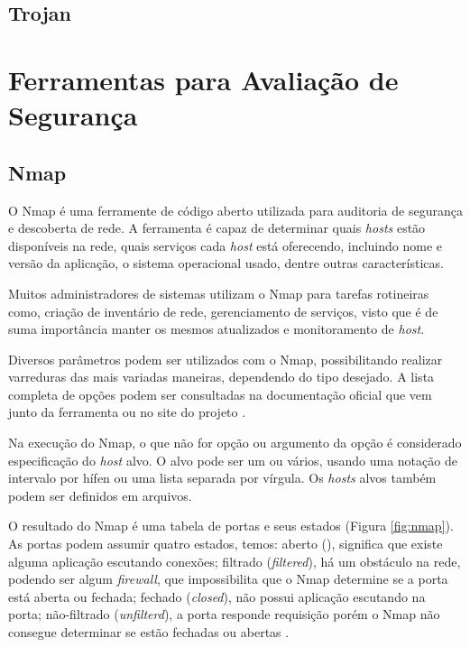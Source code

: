 \documentclass[
	12pt,				
	openright,		
	twoside,	
	a4paper,
	english,	
	brazil	
	]{abntex2}
\begin{document}
\subsection{Trojan} \label{sec:trojan}
\section{Ferramentas para Avaliação de Segurança} \label{sec:ferramentas}

\subsection{Nmap} \label{sec:nmap}

O Nmap é uma ferramente de código aberto utilizada para auditoria de segurança e descoberta de rede. A ferramenta é capaz de determinar quais \textit{hosts} estão disponíveis na rede, quais serviços cada \textit{host} está oferecendo, incluindo nome e versão da aplicação, o sistema operacional usado, dentre outras características.  

Muitos administradores de sistemas utilizam o Nmap para tarefas rotineiras como, criação de inventário de rede, gerenciamento de serviços, visto que é de suma importância manter os mesmos atualizados e monitoramento de \textit{host}.

Diversos parâmetros podem ser utilizados com o Nmap, possibilitando realizar varreduras das mais variadas maneiras, dependendo do tipo desejado. A lista completa de opções podem ser consultadas na documentação oficial que vem junto da ferramenta ou no site do projeto \cite{nmap}. 

Na execução do Nmap, o que não for opção ou argumento da opção é considerado especificação do \textit{host} alvo. O alvo pode ser um ou vários, usando uma notação de intervalo por hífen ou uma lista separada por vírgula. Os \textit{hosts} alvos também podem ser definidos em arquivos.

O resultado do Nmap é uma tabela de portas e seus estados (Figura \ref{fig:nmap}). As portas podem assumir quatro estados, temos: aberto (), significa que existe alguma aplicação escutando conexões; filtrado (\textit{filtered}), há um obstáculo na rede, podendo ser algum \textit{firewall}, que impossibilita que o Nmap determine se a porta está aberta ou fechada; fechado (\textit{closed}), não possui aplicação escutando na porta; não-filtrado (\textit{unfilterd}), a porta responde requisição porém o Nmap não consegue determinar se estão fechadas ou abertas \cite{nmap}.
\end{document}
